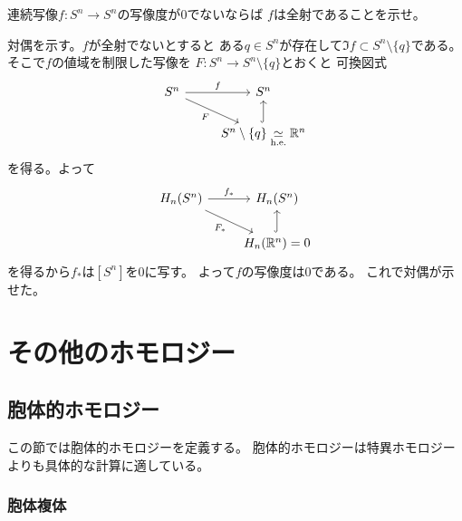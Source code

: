 \documentclass[report]{jlreq}
\begin{document}
\begin{problem}
    連続写像$f \colon S^n \to S^n$の写像度が$0$でないならば
    $f$は全射であることを示せ。
\end{problem}

\begin{answer}
    対偶を示す。$f$が全射でないとすると
    ある$q \in S^n$が存在して$\Im f \subset S^n \setminus \{q\}$である。
    そこで$f$の値域を制限した写像を
    $F \colon S^n \to S^n \setminus \{q\}$とおくと
    可換図式
    \begin{equation}
        \begin{tikzcd}
            S^n
                \ar{r}{f}
                \ar{rd}[swap]{F}
                & S^n \\
            & S^n \setminus \{q\} \simeqhe \R^n
                \ar[hook]{u}
        \end{tikzcd}
    \end{equation}
    を得る。よって
    \begin{equation}
        \begin{tikzcd}
            H_n(S^n)
                \ar{r}{f_*}
                \ar{rd}[swap]{F_*}
                & H_n(S^n) \\
            & H_n(\R^n) = 0
                \ar[hook]{u}
        \end{tikzcd}
    \end{equation}
    を得るから$f_*$は$[S^n]$を$0$に写す。
    よって$f$の写像度は$0$である。
    これで対偶が示せた。
\end{answer}


%
\chapter{その他のホモロジー}

%
\section{胞体的ホモロジー}

この節では胞体的ホモロジーを定義する。
胞体的ホモロジーは特異ホモロジーよりも具体的な計算に適している。

\subsection{胞体複体}
\end{document}
